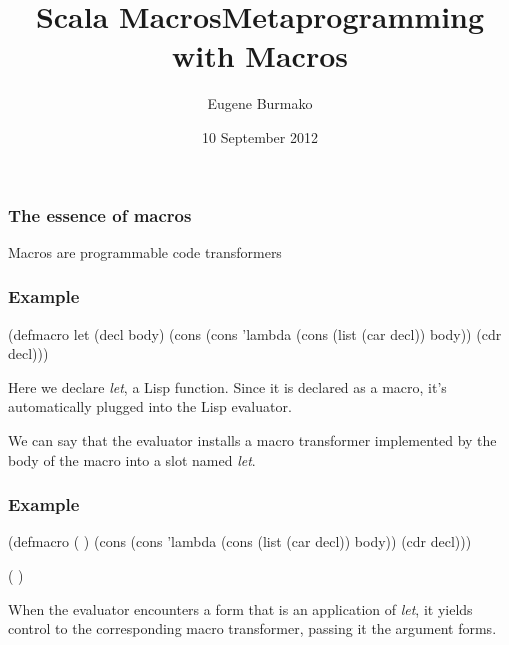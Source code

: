 \documentclass[hyperref={bookmarks=false}]{beamer}
\title{Scala Macros}
\begin{document}
\title{Metaprogramming with Macros}
\author{Eugene Burmako}
\date{10 September 2012}
{
\begin{frame}
  \titlepage
\end{frame}
}

\begin{frame}[fragile]
\frametitle{The essence of macros}
Macros are programmable code transformers
\end{frame}

\begin{frame}[fragile]
\frametitle{Example} %

\begin{lstlistinglike}
\begin{semiverbatim}
(\alert{defmacro} let (decl body)
  (cons
   (cons 'lambda
         (cons (list (car decl)) body))
   (cdr decl)))
\end{semiverbatim}
\end{lstlistinglike}

Here we declare \emph{let}, a Lisp function. Since it is declared as a macro,
it's automatically plugged into the Lisp evaluator.

We can say that the evaluator installs a macro transformer implemented by the body of the macro
into a slot named \emph{let}.
\end{frame}

\begin{frame}[fragile]
\frametitle{Example} %

\begin{lstlistinglike}
\begin{semiverbatim}
(defmacro \text{\color{blue}{let}} (\text{\color{red}{decl}} \text{\color{violet}{body}})
  (cons
   (cons 'lambda
         (cons (list (car decl)) body))
   (cdr decl)))

(\text{\color{blue}{let}} \text{\color{red}{(x 42)}} \text{\color{violet}{(print x)}})
\end{semiverbatim}
\end{lstlistinglike}

When the evaluator encounters a form that is an application of \emph{let},
it yields control to the corresponding macro transformer,
passing it the argument forms.
\end{frame}
\end{document}
